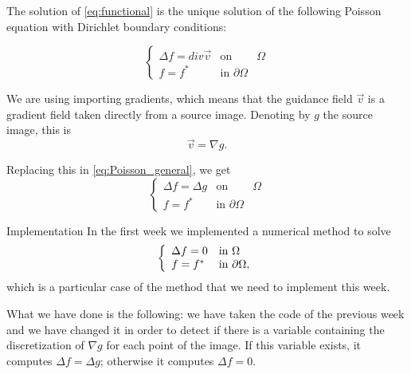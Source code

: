 \documentclass[11pt]{beamer}
\begin{document}
\begin{frame}
The solution of \ref{eq:functional}  is the unique solution of the following Poisson equation with Dirichlet boundary conditions:

\begin{equation}
\left\{\begin{matrix}
 \Delta f=div \overrightarrow{v} & \text{on } & \Omega\\ 
 f=f^{*}& \text{in }\partial\Omega
\end{matrix}\right.
\label{eq:Poisson_general}
\end{equation}

We are using importing gradients, which means that the guidance field $\overrightarrow{v}$ is a gradient field taken directly from a source image. Denoting
by $g$ the source image, this is
$$\overrightarrow{v} = \nabla g.$$

Replacing this in \ref{eq:Poisson_general}, we get
\begin{equation}
\left\{\begin{matrix}
 \Delta f=\Delta g & \text{on } & \Omega\\ 
 f=f^{*}& \text{in }\partial\Omega
\end{matrix}\right.
\end{equation}

\end{frame}

\begin{frame}{Implementation}
In the first week we implemented a numerical method to solve
$$\left\lbrace
\begin{array}{l l}

\Delta f = 0& \text{in }\Omega \\
f = f^* & \text{in }\partial\Omega,

\end{array}\right.
$$
which is a particular case of the method that we need to implement this week. 

What we have done is the following: we have taken the code of the previous week and we have changed it in order to detect if there is a variable containing the discretization of $\nabla g$ for each point of the image. If this variable exists, it computes $\Delta f = \Delta g$; otherwise it computes $\Delta f = 0$.
\end{frame}
\end{document}
